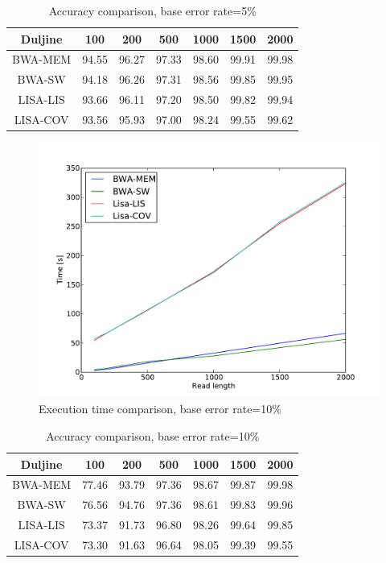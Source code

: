 \documentclass[times, utf8, diplomski]{fer}
\begin{document}
\begin{table}[H]
\centering
\begin{tabular}{|c||c|c|c|c|c|c|}
\hline
	Duljine & 100 & 200 & 500 & 1000 & 1500 & 2000\\
\hline
\hline
	BWA-MEM & 94.55 & 96.27 & 97.33 & 98.60 & 99.91 & 99.98\\
\hline
	BWA-SW  & 94.18 & 96.26 & 97.31 & 98.56 & 99.85 & 99.95\\
\hline
	LISA-LIS  & 93.66 & 96.11 & 97.20 & 98.50 & 99.82 & 99.94\\
\hline
	LISA-COV & 93.56 & 95.93 & 97.00 & 98.24 & 99.55 & 99.62\\
\hline
\end{tabular}
\caption{Accuracy comparison, base error rate=5\%}\label{chicken-e05-correct}
\end{table}



\begin{figure}[H]
\centering
\includegraphics[width=1.0\textwidth]{../img/chicken-e10-time.pdf}
\caption{Execution time comparison, base error rate=10\%}\label{chicken-e10-time}
\end{figure}

\begin{table}[H]
\centering
\begin{tabular}{|c||c|c|c|c|c|c|}
\hline
	Duljine & 100 & 200 & 500 & 1000 & 1500 & 2000\\
\hline
\hline
	BWA-MEM & 77.46 & 93.79 & 97.36 & 98.67 & 99.87 & 99.98\\
\hline
	BWA-SW  & 76.56 & 94.76 & 97.36 & 98.61 & 99.83 & 99.96\\
\hline
	LISA-LIS   & 73.37 & 91.73 & 96.80 & 98.26 & 99.64 & 99.85\\
\hline
	LISA-COV  & 73.30 & 91.63 & 96.64 & 98.05 & 99.39 & 99.55\\
\hline
\end{tabular}
\caption{Accuracy comparison, base error rate=10\%}\label{chicken-e10-correct}
\end{table}
\end{document}
